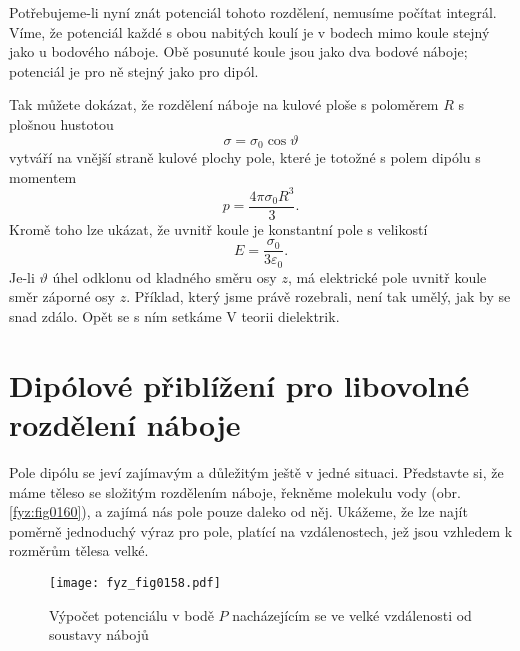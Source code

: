   Potřebujeme-li nyní znát potenciál tohoto rozdělení, nemusíme počítat integrál. Víme, že potenciál
  každé s obou nabitých koulí je v bodech mimo koule stejný jako u bodového náboje. Obě posunuté
  koule jsou jako dva bodové náboje; potenciál je pro ně stejný jako pro dipól.
  
  Tak můžete dokázat, že rozdělení náboje na kulové ploše s poloměrem \(R\) s plošnou hustotou
  \begin{equation}\label{fyz:eq_fey_034}
    \sigma = \sigma_0\cos\vartheta
  \end{equation}
  vytváří na vnější straně kulové plochy pole, které je totožné s polem dipólu s momentem
  \begin{equation}\label{fyz:eq_fey_035}
      p = \frac{4\pi\sigma_0 R^3}{3}.
  \end{equation}      
  Kromě toho lze ukázat, že uvnitř koule je konstantní pole s velikostí
  \begin{equation}\label{fyz:eq_fey_036}
    E = \frac{\sigma_0}{3\varepsilon_0}.
  \end{equation}   
  Je-li \(\vartheta\) úhel odklonu od kladného směru osy \(z\), má elektrické pole uvnitř koule směr
  záporné osy \(z\). Příklad, který jsme právě rozebrali, není tak umělý, jak by se snad zdálo. Opět
  se s ním setkáme V teorii dielektrik.

\section{Dipólové přiblížení pro libovolné rozdělení náboje}\label{fyz:IIchapVsecXIV}
  Pole dipólu se jeví zajímavým a důležitým ještě v jedné situaci. Představte si, že máme těleso se
  složitým rozdělením náboje, řekněme molekulu vody (obr. \ref{fyz:fig0160}), a zajímá nás pole pouze
  daleko od něj. Ukážeme, že lze najít poměrně jednoduchý výraz pro pole, platící na vzdálenostech,
  jež jsou vzhledem k rozměrům tělesa velké.

  \begin{figure}[ht!]   %
    \centering
    \texttt{[image: fyz\_fig0158.pdf]}
    \caption{Výpočet potenciálu v bodě \(P\) nacházejícím se ve velké vzdálenosti od soustavy 
             nábojů \cite[s.~107]{Feynman02}}
    \label{fyz:fig0158}
  \end{figure}
  
